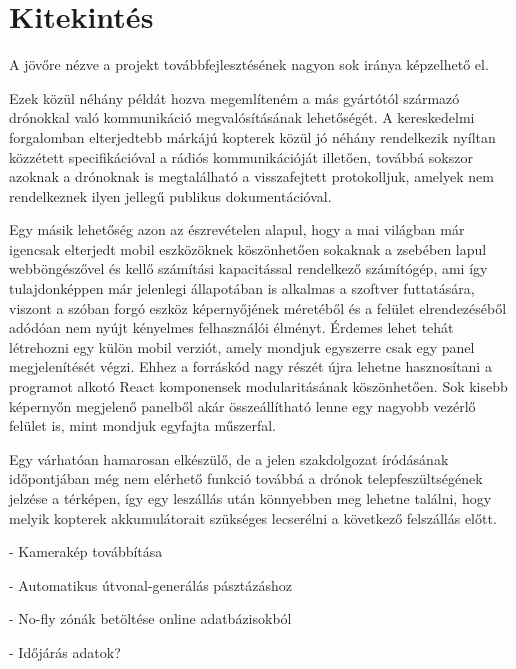 \section{Kitekintés}

A jövőre nézve a projekt továbbfejlesztésének nagyon sok iránya képzelhető el.

Ezek közül néhány példát hozva megemlíteném a más gyártótól származó drónokkal
való kommunikáció megvalósításának lehetőségét. A kereskedelmi forgalomban
elterjedtebb márkájú kopterek közül jó néhány rendelkezik nyíltan közzétett
specifikációval a rádiós kommunikációját illetően, továbbá sokszor azoknak a
drónoknak is megtalálható a visszafejtett protokolljuk, amelyek nem rendelkeznek
ilyen jellegű publikus dokumentációval.

Egy másik lehetőség azon az észrevételen alapul, hogy a mai világban már
igencsak elterjedt mobil eszközöknek köszönhetően sokaknak a zsebében lapul
webböngészővel és kellő számítási kapacitással rendelkező számítógép, ami így
tulajdonképpen már jelenlegi állapotában is alkalmas a szoftver futtatására,
viszont a szóban forgó eszköz képernyőjének méretéből és a felület
elrendezéséből adódóan nem nyújt kényelmes felhasználói élményt. Érdemes lehet
tehát létrehozni egy külön mobil verziót, amely mondjuk egyszerre csak egy panel
megjelenítését végzi. Ehhez a forráskód nagy részét újra lehetne hasznosítani a
programot alkotó React komponensek modularitásának köszönhetően. Sok kisebb
képernyőn megjelenő panelből akár összeállítható lenne egy nagyobb vezérlő
felület is, mint mondjuk egyfajta műszerfal.

Egy várhatóan hamarosan elkészülő, de a jelen szakdolgozat íródásának
időpontjában még nem elérhető funkció továbbá a drónok telepfeszültségének
jelzése a térképen, így egy leszállás után könnyebben meg lehetne találni, hogy
melyik kopterek akkumulátorait szükséges lecserélni a következő felszállás
előtt.

- Kamerakép továbbítása

- Automatikus útvonal-generálás pásztázáshoz

- No-fly zónák betöltése online adatbázisokból

- Időjárás adatok?
